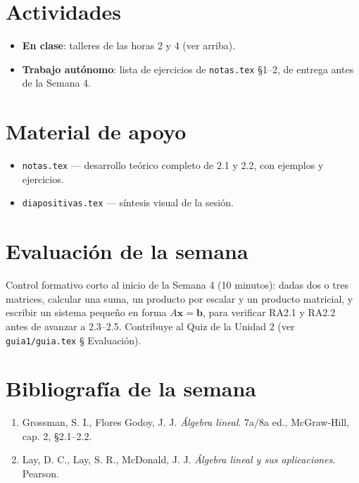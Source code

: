 \documentclass[11pt,letterpaper]{article}
\newcommand{\vv}[1]{\mathbf{#1}}
\begin{document}
\section{Actividades}

\begin{itemize}[leftmargin=1.2cm]
  \item \textbf{En clase}: talleres de las horas 2 y 4 (ver arriba).
  \item \textbf{Trabajo autónomo}: lista de ejercicios de \texttt{notas.tex} §1--2, de entrega
        antes de la Semana 4.
\end{itemize}

\section{Material de apoyo}

\begin{itemize}[leftmargin=1.2cm]
  \item \texttt{notas.tex} --- desarrollo teórico completo de 2.1 y 2.2, con ejemplos y ejercicios.
  \item \texttt{diapositivas.tex} --- síntesis visual de la sesión.
\end{itemize}

\section{Evaluación de la semana}

Control formativo corto al inicio de la Semana 4 (10 minutos): dadas dos o tres matrices, calcular
una suma, un producto por escalar y un producto matricial, y escribir un sistema pequeño en forma
$A\vv{x}=\vv{b}$, para verificar RA2.1 y RA2.2 antes de avanzar a 2.3--2.5. Contribuye al Quiz de
la Unidad 2 (ver \texttt{guia1/guia.tex} § Evaluación).

\section{Bibliografía de la semana}

\begin{enumerate}[leftmargin=1.2cm]
  \item Grossman, S. I., Flores Godoy, J. J. \emph{Álgebra lineal}. 7a/8a ed., McGraw-Hill,
        cap. 2, §2.1--2.2.
  \item Lay, D. C., Lay, S. R., McDonald, J. J. \emph{Álgebra lineal y sus aplicaciones}. Pearson.
\end{enumerate}
\end{document}
